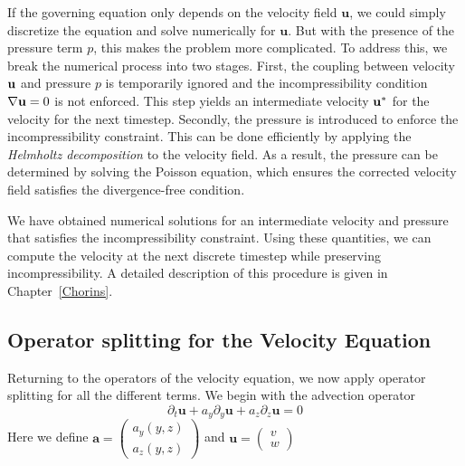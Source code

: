 If the governing equation only depends on the velocity field $\textbf{u}$,
we could simply discretize the equation and solve numerically for 
$\textbf{u}$. But with the presence of the pressure term $p$, this makes
the problem more complicated. To address this, we break the numerical
process into two stages. First, the coupling between velocity $\textbf u$
and pressure $p$ is temporarily ignored and the incompressibility
condition $\nabla \textbf u = 0$ is not enforced. This step yields an
intermediate velocity $\textbf u^*$ for the velocity for the next
timestep. Secondly, the pressure is introduced to enforce the
incompressibility constraint. This can be done efficiently by applying the
\textit{Helmholtz decomposition} to the velocity field. As a result, the
pressure can be determined by solving the Poisson equation, which ensures
the corrected velocity field satisfies the divergence-free condition.

We have obtained numerical solutions for an intermediate velocity and
pressure that satisfies the incompressibility constraint. Using these
quantities, we can compute the velocity at the next discrete timestep
while preserving incompressibility. A detailed description of this
procedure is given in Chapter~\ref{Chorins}.

\subsection{Operator splitting for the Velocity Equation}

Returning to the operators of the velocity equation, we now apply
operator splitting for all the different terms.
We begin with the advection operator
$$\partial_t \bm{u} + a_y\partial_y \bm{u} + a_z\partial_z\bm{u} = 0$$
Here we define
$
\bm{a} = 
\begin{pmatrix}
    a_y(y,z) \\
    a_z(y,z)
\end{pmatrix}$
and 
$\bm{u} = \begin{pmatrix}
    v \\
    w
\end{pmatrix}$

